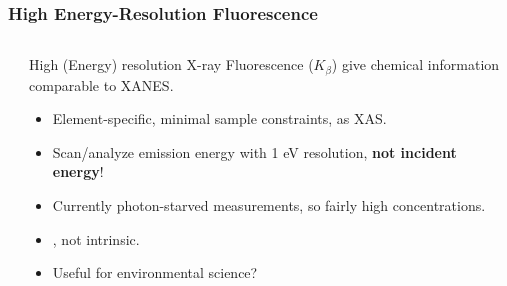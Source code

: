 \begin{frame}\frametitle{High Energy-Resolution Fluorescence}


\begin{columns}[T]
  \begin{column}{48mm}
    {}
  \end{column}
  \begin{column}{65mm}

    High (Energy) resolution X-ray Fluorescence ($K_\beta$)
    give chemical information comparable to XANES.

\begin{itemize}
\item Element-specific, minimal sample constraints, as XAS.
\item Scan/analyze emission energy with 1 eV resolution, {\bf{not incident energy}}!
\item Currently photon-starved measurements, so fairly high concentrations.
\item {}, not intrinsic.
\item Useful for environmental science?
\end{itemize}



  \end{column}
\end{columns}
\end{frame}
